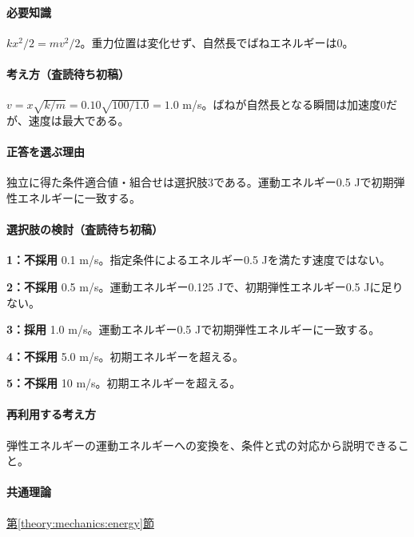\paragraph{必要知識} \(kx^2/2=mv^2/2\)。重力位置は変化せず、自然長でばねエネルギーは0。

\paragraph{考え方（査読待ち初稿）} \(v=x\sqrt{k/m}=0.10\sqrt{100/1.0}=1.0\) m/s。ばねが自然長となる瞬間は加速度0だが、速度は最大である。

\paragraph{正答を選ぶ理由} 独立に得た条件適合値・組合せは選択肢3である。運動エネルギー0.5 Jで初期弾性エネルギーに一致する。

\paragraph{選択肢の検討（査読待ち初稿）}\mbox{}\par

\noindent\textbf{1：不採用} 0.1 m/s。指定条件によるエネルギー0.5 Jを満たす速度ではない。\par

\noindent\textbf{2：不採用} 0.5 m/s。運動エネルギー0.125 Jで、初期弾性エネルギー0.5 Jに足りない。\par

\noindent\textbf{3：採用} 1.0 m/s。運動エネルギー0.5 Jで初期弾性エネルギーに一致する。\par

\noindent\textbf{4：不採用} 5.0 m/s。初期エネルギーを超える。\par

\noindent\textbf{5：不採用} 10 m/s。初期エネルギーを超える。\par

\paragraph{再利用する考え方} 弾性エネルギーの運動エネルギーへの変換を、条件と式の対応から説明できること。

\paragraph{共通理論} \hyperref[theory:mechanics:energy]{第\ref*{theory:mechanics:energy}節}

